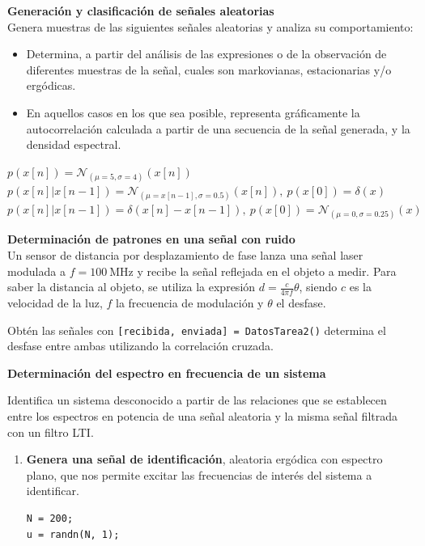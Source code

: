 \documentclass[10pt,twoside,spanish,a4paper]{article}
\begin{document}
	\begin{itemize}
		\itemP \textbf{Generación y clasificación de señales aleatorias}\\
		Genera muestras de las siguientes señales aleatorias y analiza su comportamiento:
		\begin{itemize}
			\item Determina, a partir del análisis de las expresiones o de la observación de diferentes muestras de la señal, cuales son markovianas, estacionarias y/o ergódicas. 
			\item En aquellos casos en los que sea posible, representa gráficamente la autocorrelación calculada a partir de una secuencia de la señal generada, y la densidad espectral.
		\end{itemize}

		\begin{itemize}
			\itemR $p(x[n])=\mathcal{N}_{(\mu=5,\sigma=4)}(x[n])$	
			\itemR $p(x[n]|x[n-1])=\mathcal{N}_{(\mu=x[n-1],\sigma=0.5)}(x[n]),~p(x[0])=\delta(x)$
			\itemR $p(x[n]|x[n-1])=\delta(x[n]-x[n-1]),~p(x[0])=\mathcal{N}_{(\mu=0,\sigma=0.25)}(x)$
		\end{itemize}

		\itemP  \textbf{Determinación de patrones en una señal con ruido}\\
		Un sensor de distancia por desplazamiento de fase lanza una señal laser modulada a $f=100~\mathrm{MHz}$ y recibe la
		señal reflejada en el objeto a medir. Para saber la distancia al objeto, se utiliza la expresión $d=\frac{c}{4\pi f}\theta$,
		siendo $c$ es la velocidad de la luz, $f$ la frecuencia de modulación y $\theta$ el desfase. 
		
		Obtén las señales con \color{blue}\texttt{[recibida, enviada] = DatosTarea2()} \color{black}
		determina el desfase entre ambas utilizando la correlación cruzada.

  \newpage
  \itemP  \textbf{Determinación del espectro en frecuencia de un sistema}

  Identifica un sistema desconocido a partir de las relaciones que se establecen entre los espectros en potencia de una señal aleatoria y la misma señal filtrada con un filtro LTI.

  \begin{enumerate}
	  \item \textbf{Genera una señal de identificación}, aleatoria ergódica con espectro plano, que nos permite excitar las frecuencias
	  de interés del sistema a identificar.
  		\begin{lstlisting}[style=Matlab-editor,basicstyle=\scriptsize]
N = 200;
u = randn(N, 1);
			\end{lstlisting}


\end{enumerate}
\end{itemize}
\end{document}
